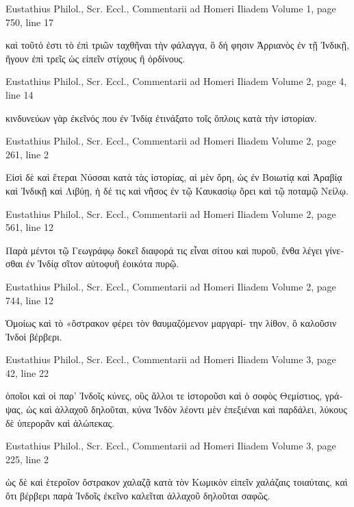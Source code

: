 \documentclass[12pt,letterpaper,twoside,final]{memoir}
\begin{document}
\begin{greek}
Eustathius Philol., Scr. Eccl., Commentarii ad Homeri Iliadem 
Volume 1, page 750, line 17

                                                               καὶ τοῦτό ἐστι τὸ ἐπὶ 
τριῶν ταχθῆναι τὴν φάλαγγα, ὃ δή φησιν Ἀρριανὸς ἐν τῇ Ἰνδικῇ, ἤγουν ἐπὶ 
τρεῖς ὡς εἰπεῖν στίχους ἢ ὀρδίνους. 



Eustathius Philol., Scr. Eccl., Commentarii ad Homeri Iliadem 
Volume 2, page 4, line 14

                                  κινδυνεύων γὰρ ἐκεῖνός που ἐν Ἰνδίᾳ ἐτινάξατο 
τοῖς ὅπλοις κατὰ τὴν ἱστορίαν. 



Eustathius Philol., Scr. Eccl., Commentarii ad Homeri Iliadem 
Volume 2, page 261, line 2

                                                                Εἰσὶ δὲ καὶ ἕτεραι 
Νύσσαι κατὰ τὰς ἱστορίας, αἱ μὲν ὄρη, ὡς ἐν Βοιωτίᾳ καὶ Ἀραβίᾳ καὶ Ἰνδικῇ 
καὶ Λιβύῃ, ἡ δέ τις καὶ νῆσος ἐν τῷ Καυκασίῳ ὄρει καὶ τῷ ποταμῷ Νείλῳ. 



Eustathius Philol., Scr. Eccl., Commentarii ad Homeri Iliadem 
Volume 2, page 561, line 12

                                                                          Παρὰ μέντοι 
τῷ Γεωγράφῳ δοκεῖ διαφορά τις εἶναι σίτου καὶ πυροῦ, ἔνθα λέγει γίνεσθαι 
ἐν Ἰνδίᾳ σῖτον αὐτοφυῆ ἐοικότα πυρῷ. 



Eustathius Philol., Scr. Eccl., Commentarii ad Homeri Iliadem 
Volume 2, page 744, line 12

                  Ὁμοίως καὶ τὸ «ὄστρακον φέρει τὸν θαυμαζόμενον μαργαρί-
την λίθον, ὃ καλοῦσιν Ἰνδοὶ βέρβερι. 



Eustathius Philol., Scr. Eccl., Commentarii ad Homeri Iliadem 
Volume 3, page 42, line 22

                                    ὁποῖοι καὶ οἱ παρ' Ἰνδοῖς κύνες, οὓς ἄλλοι 
τε ἱστοροῦσι καὶ ὁ σοφὸς Θεμίστιος, γράψας, ὡς καὶ ἀλλαχοῦ δηλοῦται, κύνα 
Ἰνδὸν λέοντι μὲν ἐπεξιέναι καὶ παρδάλει, λύκους δὲ ὑπερορᾶν καὶ ἀλώπεκας. 



Eustathius Philol., Scr. Eccl., Commentarii ad Homeri Iliadem 
Volume 3, page 225, line 2

           ὡς δὲ καὶ ἑτεροῖον ὄστρακον χαλαζᾷ κατὰ τὸν Κωμικὸν εἰπεῖν 
χαλάζαις τοιαύταις, καὶ ὅτι βέρβερι παρὰ Ἰνδοῖς ἐκεῖνο καλεῖται ἀλλαχοῦ 
δηλοῦται σαφῶς. 




\end{greek}
\end{document}
